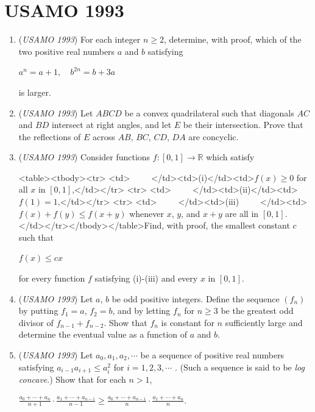 \section{USAMO 1993}
        \begin{enumerate}
        	\item (\textit{USAMO 1993}) For each integer $n\ge2$, determine, with proof, which of the two positive real numbers $a$ and $b$ satisfying


 $a^n = a + 1, \quad b^{2n} = b + 3a$

 is larger.


 

	\item (\textit{USAMO 1993}) Let $ABCD$ be a convex quadrilateral such that diagonals $AC$ and $BD$ intersect at right angles, and let $E$ be their intersection. Prove that the reflections of $E$ across $AB$, $BC$, $CD$, $DA$ are concyclic.


 

	\item (\textit{USAMO 1993}) Consider functions $f : [0, 1] \rightarrow \mathbb{R}$ which satisfy


 <table><tbody><tr>
<td>     </td><td>(i)</td><td>$f(x)\ge0$ for all $x$ in $[0, 1]$,</td></tr>
<tr>
<td>     </td><td>(ii)</td><td>$f(1) = 1$,</td></tr>
<tr>
<td>     </td><td>(iii)     </td><td>$f(x) + f(y) \le f(x + y)$ whenever $x$, $y$, and $x + y$ are all in $[0, 1]$.</td></tr></tbody></table>Find, with proof, the smallest constant $c$ such that


 $f(x) \le cx$

 for every function $f$ satisfying (i)-(iii) and every $x$ in $[0, 1]$.


 

	\item (\textit{USAMO 1993}) Let $a$, $b$ be odd positive integers. Define the sequence $(f_n)$ by putting $f_1 = a$,
$f_2 = b$, and by letting $f_n$ for $n\ge3$ be the greatest odd divisor of $f_{n-1} + f_{n-2}$.
Show that $f_n$ is constant for $n$ sufficiently large and determine the eventual
value as a function of $a$ and $b$.


 

	\item (\textit{USAMO 1993}) Let $a_0, a_1, a_2,\cdots$ be a sequence of positive real numbers satisfying $a_{i-1}a_{i+1}\le a^2_i$
for $i = 1, 2, 3,\cdots$ . (Such a sequence is said to be \textit{log concave}.) Show that for
each $n > 1$,


 $\frac{a_0+\cdots+a_n}{n+1}\cdot\frac{a_1+\cdots+a_{n-1}}{n-1}\ge\frac{a_0+\cdots+a_{n-1}}{n}\cdot\frac{a_1+\cdots+a_{n}}{n}$.

 

\end{enumerate}